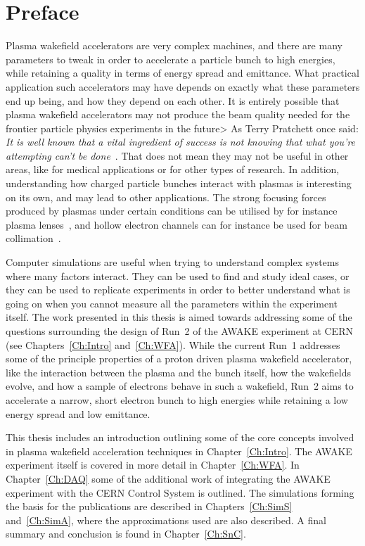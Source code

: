 \chapter*{Preface}

Plasma wakefield accelerators are very complex machines, and there are many parameters to tweak in order to accelerate a particle bunch to high energies, while retaining a quality in terms of energy spread and emittance.
What practical application such accelerators may have depends on exactly what these parameters end up being, and how they depend on each other.
It is entirely possible that plasma wakefield accelerators may not produce the beam quality needed for the frontier particle physics experiments in the future>
As Terry Pratchett once said: \textit{It is well known that a vital ingredient of success is not knowing that what you're attempting can't be done}~\cite{pratchett:1987}.
That does not mean they may not be useful in other areas, like for medical applications or for other types of research.
In addition, understanding how charged particle bunches interact with plasmas is interesting on its own, and may lead to other applications.
The strong focusing forces produced by plasmas under certain conditions can be utilised by for instance plasma lenses~\cite{su:1990}, and hollow electron channels can for instance be used for beam collimation~\cite{stancari:2014}.

Computer simulations are useful when trying to understand complex systems where many factors interact.
They can be used to find and study ideal cases, or they can be used to replicate experiments in order to better understand what is going on when you cannot measure all the parameters within the experiment itself.
The work presented in this thesis is aimed towards addressing some of the questions surrounding the design of Run~2 of the AWAKE experiment at CERN (see Chapters~\ref{Ch:Intro} and~\ref{Ch:WFA}).
While the current Run~1 addresses some of the principle properties of a proton driven plasma wakefield accelerator, like the interaction between the plasma and the bunch itself, how the wakefields evolve, and how a sample of electrons behave in such a wakefield, Run~2 aims to accelerate a narrow, short electron bunch to high energies while retaining a low energy spread and low emittance.

This thesis includes an introduction outlining some of the core concepts involved in plasma wakefield acceleration techniques in Chapter~\ref{Ch:Intro}.
The AWAKE experiment itself is covered in more detail in Chapter~\ref{Ch:WFA}.
In Chapter~\ref{Ch:DAQ} some of the additional work of integrating the AWAKE experiment with the CERN Control System is outlined.
The simulations forming the basis for the publications are described in Chapters~\ref{Ch:SimS} and~\ref{Ch:SimA}, where the approximations used are also described.
A final summary and conclusion is found in Chapter~\ref{Ch:SnC}.

